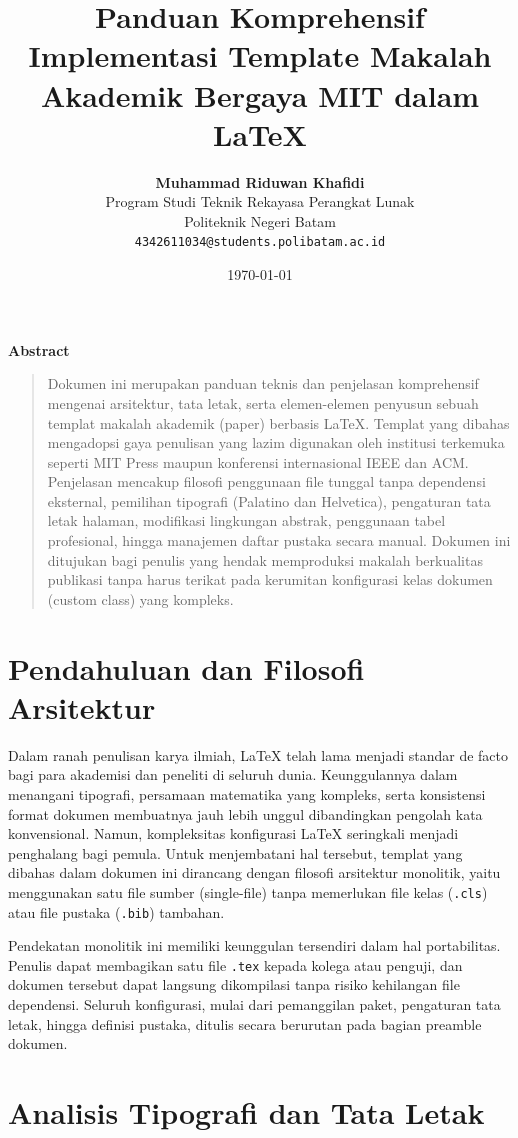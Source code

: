\documentclass[11pt,a4paper]{article}
\title{\vspace{-1cm}\textbf{\sffamily\LARGE Panduan Komprehensif Implementasi Template Makalah Akademik Bergaya MIT dalam LaTeX}}
\author{
	\textbf{Muhammad Riduwan Khafidi} \\ 
	\small Program Studi Teknik Rekayasa Perangkat Lunak \\
	\small Politeknik Negeri Batam \\
	\small \texttt{4342611034@students.polibatam.ac.id}
}
\date{\small\today}
\renewenvironment{abstract}
{\small
	\begin{center}\textbf{\sffamily Abstract}\end{center}
	\begin{quote}}
	{\end{quote}}
\begin{document}
	
	\maketitle
	\thispagestyle{empty}
	
	\begin{abstract}
		Dokumen ini merupakan panduan teknis dan penjelasan komprehensif mengenai arsitektur, tata letak, serta elemen-elemen penyusun sebuah templat makalah akademik (paper) berbasis LaTeX. Templat yang dibahas mengadopsi gaya penulisan yang lazim digunakan oleh institusi terkemuka seperti MIT Press maupun konferensi internasional IEEE dan ACM. Penjelasan mencakup filosofi penggunaan file tunggal tanpa dependensi eksternal, pemilihan tipografi (Palatino dan Helvetica), pengaturan tata letak halaman, modifikasi lingkungan abstrak, penggunaan tabel profesional, hingga manajemen daftar pustaka secara manual. Dokumen ini ditujukan bagi penulis yang hendak memproduksi makalah berkualitas publikasi tanpa harus terikat pada kerumitan konfigurasi kelas dokumen (custom class) yang kompleks.
	\end{abstract}
	
	\section{Pendahuluan dan Filosofi Arsitektur}
	
	Dalam ranah penulisan karya ilmiah, LaTeX telah lama menjadi standar de facto bagi para akademisi dan peneliti di seluruh dunia. Keunggulannya dalam menangani tipografi, persamaan matematika yang kompleks, serta konsistensi format dokumen membuatnya jauh lebih unggul dibandingkan pengolah kata konvensional. Namun, kompleksitas konfigurasi LaTeX seringkali menjadi penghalang bagi pemula. Untuk menjembatani hal tersebut, templat yang dibahas dalam dokumen ini dirancang dengan filosofi arsitektur monolitik, yaitu menggunakan satu file sumber (single-file) tanpa memerlukan file kelas (\texttt{.cls}) atau file pustaka (\texttt{.bib}) tambahan.
	
	Pendekatan monolitik ini memiliki keunggulan tersendiri dalam hal portabilitas. Penulis dapat membagikan satu file \texttt{.tex} kepada kolega atau penguji, dan dokumen tersebut dapat langsung dikompilasi tanpa risiko kehilangan file dependensi. Seluruh konfigurasi, mulai dari pemanggilan paket, pengaturan tata letak, hingga definisi pustaka, ditulis secara berurutan pada bagian preamble dokumen.
	
	\section{Analisis Tipografi dan Tata Letak}
	
\end{document}
